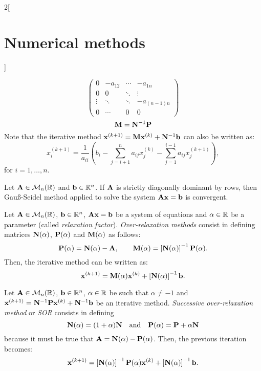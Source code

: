 \documentclass[../../../main.tex]{subfiles}
\begin{document}
\begin{multicols}{2}[\section{Numerical methods}]
\begin{definition}
\begin{equation*}
\begin{pmatrix}
            0 & -a_{12} & \cdots & -a_{1n}\\
            0 & 0 & \ddots & \vdots\\
            \vdots & \ddots & \ddots & -a_{(n-1)n}\\
            0 & \cdots & 0 & 0
        \end{pmatrix}
    \end{equation*}
    \begin{equation*}
        \vb{M}=\vb{N}^{-1}\vb{P}
    \end{equation*}
    Note that the iterative method $\vb{x}^{(k+1)}=\vb{M}\vb{x}^{(k)}+\vb{N}^{-1}\vb{b}$ can also be written as: $$x_i^{(k+1)}=\frac{1}{a_{ii}}\left(b_i-\sum_{j=i+1}^na_{ij}x_j^{(k)}-\sum_{j=1}^{i-1}a_{ij}x_j^{(k+1)}\right),$$ for $i=1,\ldots,n$.
\end{definition}
\begin{theorem}
    Let $\vb{A}\in\mathcal{M}_n(\mathbb{R})$ and $\vb{b}\in\mathbb{R}^n$. If $\vb{A}$ is strictly diagonally dominant by rows, then Gau\ss-Seidel method applied to solve the system $\vb{A}\vb{x}=\vb{b}$ is convergent.
\end{theorem}
\begin{method}
    Let $\vb{A}\in\mathcal{M}_n(\mathbb{R})$, $\vb{b}\in\mathbb{R}^n$, $\vb{A}\vb{x}=\vb{b}$ be a system of equations and $\alpha\in\mathbb{R}$ be a parameter (called \textit{relaxation factor}). \textit{Over-relaxation methods} consist in defining matrices $\vb{N}(\alpha)$, $\vb{P}(\alpha)$ and $\vb{M}(\alpha)$ as follows:
    $$\vb{P}(\alpha)=\vb{N}(\alpha)-\vb{A},\qquad\vb{M}(\alpha)=\left[\vb{N}(\alpha)\right]^{-1}\vb{P}(\alpha).$$
    Then, the iterative method can be written as: $$\vb{x}^{(k+1)}=\vb{M}(\alpha)\vb{x}^{(k)}+\left[\vb{N}(\alpha)\right]^{-1}\vb{b}.$$
\end{method}
\begin{method}
    Let $\vb{A}\in\mathcal{M}_n(\mathbb{R})$, $\vb{b}\in\mathbb{R}^n$, $\alpha\in\mathbb{R}$ be such that $\alpha\ne-1$ and $\vb{x}^{(k+1)}=\vb{N}^{-1}\vb{P}\vb{x}^{(k)}+\vb{N}^{-1}\vb{b}$ be an iterative method. \textit{Successive over-relaxation method} or \textit{SOR} consists in defining $$\vb{N}(\alpha)=(1+\alpha)\vb{N}\quad\text{and}\quad\vb{P}(\alpha)=\vb{P}+\alpha\vb{N}$$ because it must be true that $\vb{A}=\vb{N}(\alpha)-\vb{P}(\alpha)$. Then, the previous iteration becomes: $$\vb{x}^{(k+1)}=\left[\vb{N}(\alpha)\right]^{-1}\vb{P}(\alpha)\vb{x}^{(k)}+\left[\vb{N}(\alpha)\right]^{-1}\vb{b}.$$

\end{method}
\end{multicols}
\end{document}
